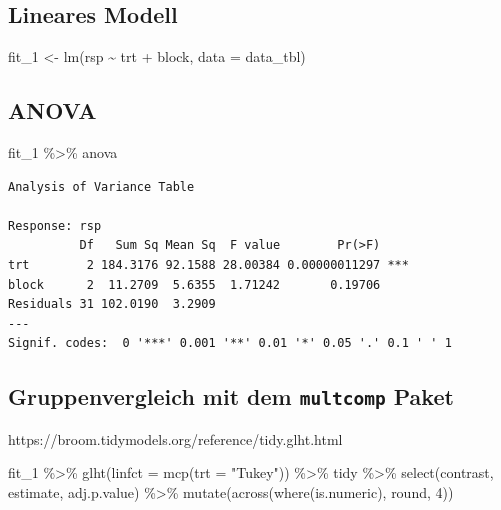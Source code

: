 \documentclass[
  letterpaper,
  DIV=11,
  oneside]{scrreport}
\newenvironment{Shaded}{\begin{snugshade}}{\end{snugshade}}
\newcommand{\AttributeTok}[1]{\textcolor[rgb]{0.40,0.45,0.13}{#1}}
\newcommand{\DecValTok}[1]{\textcolor[rgb]{0.68,0.00,0.00}{#1}}
\newcommand{\FunctionTok}[1]{\textcolor[rgb]{0.28,0.35,0.67}{#1}}
\newcommand{\NormalTok}[1]{\textcolor[rgb]{0.00,0.23,0.31}{#1}}
\newcommand{\OtherTok}[1]{\textcolor[rgb]{0.00,0.23,0.31}{#1}}
\newcommand{\SpecialCharTok}[1]{\textcolor[rgb]{0.37,0.37,0.37}{#1}}
\newcommand{\StringTok}[1]{\textcolor[rgb]{0.13,0.47,0.30}{#1}}
\begin{document}
\hypertarget{lineares-modell}{%
\subsection{Lineares Modell}\label{lineares-modell}}

\begin{Shaded}
\begin{Highlighting}[]
\NormalTok{fit\_1 }\OtherTok{\textless{}{-}} \FunctionTok{lm}\NormalTok{(rsp }\SpecialCharTok{\textasciitilde{}}\NormalTok{ trt }\SpecialCharTok{+}\NormalTok{ block, }\AttributeTok{data =}\NormalTok{ data\_tbl)}
\end{Highlighting}
\end{Shaded}

\hypertarget{anova}{%
\subsection{ANOVA}\label{anova}}

\begin{Shaded}
\begin{Highlighting}[]
\NormalTok{fit\_1 }\SpecialCharTok{\%\textgreater{}\%}\NormalTok{ anova}
\end{Highlighting}
\end{Shaded}

\begin{verbatim}
Analysis of Variance Table

Response: rsp
          Df   Sum Sq Mean Sq  F value        Pr(>F)    
trt        2 184.3176 92.1588 28.00384 0.00000011297 ***
block      2  11.2709  5.6355  1.71242       0.19706    
Residuals 31 102.0190  3.2909                           
---
Signif. codes:  0 '***' 0.001 '**' 0.01 '*' 0.05 '.' 0.1 ' ' 1
\end{verbatim}

\hypertarget{gruppenvergleich-mit-dem-multcomp-paket}{%
\subsection{\texorpdfstring{Gruppenvergleich mit dem \texttt{multcomp}
Paket}{Gruppenvergleich mit dem multcomp Paket}}\label{gruppenvergleich-mit-dem-multcomp-paket}}

https://broom.tidymodels.org/reference/tidy.glht.html

\begin{Shaded}
\begin{Highlighting}[]
\NormalTok{fit\_1 }\SpecialCharTok{\%\textgreater{}\%} 
  \FunctionTok{glht}\NormalTok{(}\AttributeTok{linfct =} \FunctionTok{mcp}\NormalTok{(}\AttributeTok{trt =} \StringTok{"Tukey"}\NormalTok{)) }\SpecialCharTok{\%\textgreater{}\%} 
\NormalTok{  tidy }\SpecialCharTok{\%\textgreater{}\%} 
  \FunctionTok{select}\NormalTok{(contrast, estimate, adj.p.value) }\SpecialCharTok{\%\textgreater{}\%} 
  \FunctionTok{mutate}\NormalTok{(}\FunctionTok{across}\NormalTok{(}\FunctionTok{where}\NormalTok{(is.numeric), round, }\DecValTok{4}\NormalTok{))}
\end{Highlighting}
\end{Shaded}
\end{document}
